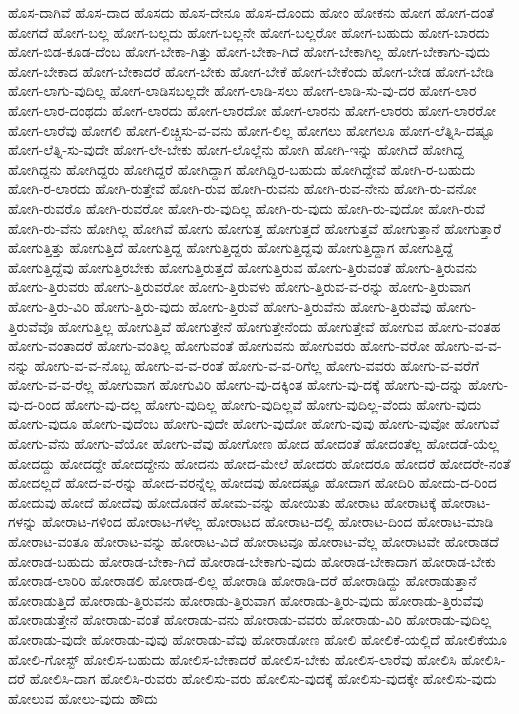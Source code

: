 {ಹೊಸ-ದಾಗಿವೆ
ಹೊಸ-ದಾದ
ಹೊಸದು
ಹೊಸ-ದೇನೂ
ಹೊಸ-ದೊಂದು
ಹೋಂ
ಹೋಕನು
ಹೋಗ
ಹೋಗ-ದಂತೆ
ಹೋಗದೆ
ಹೋಗ-ಬಲ್ಲ
ಹೋಗ-ಬಲ್ಲದು
ಹೋಗ-ಬಲ್ಲನೇ
ಹೋಗ-ಬಲ್ಲರೋ
ಹೋಗ-ಬಹುದು
ಹೋಗ-ಬಾರದು
ಹೋಗ-ಬಿಡ-ಕೂಡ-ದೆಂಬ
ಹೋಗ-ಬೇಕಾ-ಗಿತ್ತು
ಹೋಗ-ಬೇಕಾ-ಗಿದೆ
ಹೋಗ-ಬೇಕಾಗಿಲ್ಲ
ಹೋಗ-ಬೇಕಾಗು-ವುದು
ಹೋಗ-ಬೇಕಾದ
ಹೋಗ-ಬೇಕಾದರೆ
ಹೋಗ-ಬೇಕು
ಹೋಗ-ಬೇಕೆ
ಹೋಗ-ಬೇಕೆಂದು
ಹೋಗ-ಬೇಡ
ಹೋಗ-ಬೇಡಿ
ಹೋಗ-ಲಾಗು-ವುದಿಲ್ಲ
ಹೋಗ-ಲಾಡಿಸಬಲ್ಲದೇ
ಹೋಗ-ಲಾಡಿ-ಸಲು
ಹೋಗ-ಲಾಡಿ-ಸು-ವು-ದರ
ಹೋಗ-ಲಾರ
ಹೋಗ-ಲಾರ-ದಂಥದು
ಹೋಗ-ಲಾರದು
ಹೋಗ-ಲಾರದೋ
ಹೋಗ-ಲಾರನು
ಹೋಗ-ಲಾರರು
ಹೋಗ-ಲಾರರೋ
ಹೋಗ-ಲಾರೆವು
ಹೋಗಲಿ
ಹೋಗ-ಲಿಚ್ಚಿಸು-ವ-ವನು
ಹೋಗ-ಲಿಲ್ಲ
ಹೋಗಲು
ಹೋಗಲೂ
ಹೋಗ-ಲೆತ್ನಿಸಿ-ದಷ್ಟೂ
ಹೋಗ-ಲೆತ್ನಿ-ಸು-ವುದೇ
ಹೋಗ-ಲೇ-ಬೇಕು
ಹೋಗ-ಲೊಲ್ಲೆನು
ಹೋಗಿ
ಹೋಗಿ-ಇನ್ನು
ಹೋಗಿದೆ
ಹೋಗಿದ್ದ
ಹೋಗಿದ್ದನು
ಹೋಗಿದ್ದರು
ಹೋಗಿದ್ದರೆ
ಹೋಗಿದ್ದಾಗ
ಹೋಗಿದ್ದಿರ-ಬಹುದು
ಹೋಗಿದ್ದೇವೆ
ಹೋಗಿ-ರ-ಬಹುದು
ಹೋಗಿ-ರ-ಲಾರದು
ಹೋಗಿ-ರುತ್ತೇವೆ
ಹೋಗಿ-ರುವ
ಹೋಗಿ-ರುವನು
ಹೋಗಿ-ರುವ-ನೇನು
ಹೋಗಿ-ರು-ವನೋ
ಹೋಗಿ-ರುವರೊ
ಹೋಗಿ-ರುವರೋ
ಹೋಗಿ-ರು-ವುದಿಲ್ಲ
ಹೋಗಿ-ರು-ವುದು
ಹೋಗಿ-ರು-ವುದೋ
ಹೋಗಿ-ರುವೆ
ಹೋಗಿ-ರು-ವೆನು
ಹೋಗಿಲ್ಲ
ಹೋಗಿವೆ
ಹೋಗು
ಹೋಗುತ್ತ
ಹೋಗುತ್ತದೆ
ಹೋಗುತ್ತವೆ
ಹೋಗುತ್ತಾನೆ
ಹೋಗುತ್ತಾರೆ
ಹೋಗುತ್ತಿತ್ತು
ಹೋಗುತ್ತಿದೆ
ಹೋಗುತ್ತಿದ್ದ
ಹೋಗುತ್ತಿದ್ದರು
ಹೋಗುತ್ತಿದ್ದವು
ಹೋಗುತ್ತಿದ್ದಾಗ
ಹೋಗುತ್ತಿದ್ದೆ
ಹೋಗುತ್ತಿದ್ದೆವು
ಹೋಗುತ್ತಿರಬೇಕು
ಹೋಗುತ್ತಿರುತ್ತದೆ
ಹೋಗುತ್ತಿರುವ
ಹೋಗು-ತ್ತಿರುವಂತೆ
ಹೋಗು-ತ್ತಿರುವನು
ಹೋಗು-ತ್ತಿರುವರು
ಹೋಗು-ತ್ತಿರುವರೋ
ಹೋಗು-ತ್ತಿರುವಳು
ಹೋಗು-ತ್ತಿರುವ-ವ-ರನ್ನು
ಹೋಗು-ತ್ತಿರುವಾಗ
ಹೋಗು-ತ್ತಿರು-ವಿರಿ
ಹೋಗು-ತ್ತಿರು-ವುದು
ಹೋಗು-ತ್ತಿರುವೆ
ಹೋಗು-ತ್ತಿರುವೆನು
ಹೋಗು-ತ್ತಿರುವೆವು
ಹೋಗು-ತ್ತಿರುವೆವೊ
ಹೋಗುತ್ತಿಲ್ಲ
ಹೋಗುತ್ತಿವೆ
ಹೋಗುತ್ತೇನೆ
ಹೋಗುತ್ತೇನೆಂದು
ಹೋಗುತ್ತೇವೆ
ಹೋಗುವ
ಹೋಗು-ವಂತಹ
ಹೋಗು-ವಂತಾದರೆ
ಹೋಗು-ವಂತಿಲ್ಲ
ಹೋಗುವಂತೆ
ಹೋಗುವನು
ಹೋಗುವರು
ಹೋಗು-ವರೋ
ಹೋಗು-ವ-ವ-ನನ್ನು
ಹೋಗು-ವ-ವ-ನೊಬ್ಬ
ಹೋಗು-ವ-ವ-ರಂತೆ
ಹೋಗು-ವ-ವ-ರಿಗೆಲ್ಲ
ಹೋಗು-ವವರು
ಹೋಗು-ವ-ವರೆಗೆ
ಹೋಗು-ವ-ವ-ರೆಲ್ಲ
ಹೋಗುವಾಗ
ಹೋಗುವಿರಿ
ಹೋಗು-ವು-ದಕ್ಕಿಂತ
ಹೋಗು-ವು-ದಕ್ಕೆ
ಹೋಗು-ವು-ದನ್ನು
ಹೋಗು-ವು-ದ-ರಿಂದ
ಹೋಗು-ವು-ದಲ್ಲ
ಹೋಗು-ವುದಿಲ್ಲ
ಹೋಗು-ವುದಿಲ್ಲವೆ
ಹೋಗು-ವುದಿಲ್ಲ-ವೆಂದು
ಹೋಗು-ವುದು
ಹೋಗು-ವುದೂ
ಹೋಗು-ವುದೆಂಬ
ಹೋಗು-ವುದೇ
ಹೋಗು-ವುದೋ
ಹೋಗು-ವುವು
ಹೋಗು-ವುವೋ
ಹೋಗುವೆ
ಹೋಗು-ವೆನು
ಹೋಗು-ವೆಯೋ
ಹೋಗು-ವೆವು
ಹೋಗೋಣ
ಹೋದ
ಹೋದಂತೆ
ಹೋದಂತೆಲ್ಲ
ಹೋದಡೆ-ಯೆಲ್ಲ
ಹೋದದ್ದು
ಹೋದದ್ದೇ
ಹೋದದ್ದೇನು
ಹೋದನು
ಹೋದ-ಮೇಲೆ
ಹೋದರು
ಹೋದರೂ
ಹೋದರೆ
ಹೋದರೇ-ನಂತೆ
ಹೋದಲ್ಲದೆ
ಹೋದ-ವ-ರನ್ನು
ಹೋದ-ವರನ್ನೆಲ್ಲ
ಹೋದವು
ಹೋದಷ್ಟೂ
ಹೋದಾಗ
ಹೋದಿರಿ
ಹೋದು-ದ-ರಿಂದ
ಹೋದುವು
ಹೋದೆ
ಹೋದೆವು
ಹೋದೊಡನೆ
ಹೋಮ-ವನ್ನು
ಹೋಯಿತು
ಹೋರಾಟ
ಹೋರಾಟಕ್ಕೆ
ಹೋರಾಟ-ಗಳನ್ನು
ಹೋರಾಟ-ಗಳಿಂದ
ಹೋರಾಟ-ಗಳೆಲ್ಲ
ಹೋರಾಟದ
ಹೋರಾಟ-ದಲ್ಲಿ
ಹೋರಾಟ-ದಿಂದ
ಹೋರಾಟ-ಮಾಡಿ
ಹೋರಾಟ-ವಂತೂ
ಹೋರಾಟ-ವನ್ನು
ಹೋರಾಟ-ವಿದೆ
ಹೋರಾಟವೂ
ಹೋರಾಟ-ವೆಲ್ಲ
ಹೋರಾಟವೇ
ಹೋರಾಡದೆ
ಹೋರಾಡ-ಬಹುದು
ಹೋರಾಡ-ಬೇಕಾ-ಗಿದೆ
ಹೋರಾಡ-ಬೇಕಾಗು-ವುದು
ಹೋರಾಡ-ಬೇಕಾದಾಗ
ಹೋರಾಡ-ಬೇಕು
ಹೋರಾಡ-ಲಾರಿರಿ
ಹೋರಾಡಲಿ
ಹೋರಾಡ-ಲಿಲ್ಲ
ಹೋರಾಡಿ
ಹೋರಾಡಿ-ದರೆ
ಹೋರಾಡಿದ್ದು
ಹೋರಾಡುತ್ತಾನೆ
ಹೋರಾಡುತ್ತಿದೆ
ಹೋರಾಡು-ತ್ತಿರುವನು
ಹೋರಾಡು-ತ್ತಿರುವಾಗ
ಹೋರಾಡು-ತ್ತಿರು-ವುದು
ಹೋರಾಡು-ತ್ತಿರುವೆವು
ಹೋರಾಡುತ್ತೇನೆ
ಹೋರಾಡು-ವಂತೆ
ಹೋರಾಡು-ವನು
ಹೋರಾಡು-ವವರು
ಹೋರಾಡು-ವಿರಿ
ಹೋರಾಡು-ವುದಿಲ್ಲ
ಹೋರಾಡು-ವುದೇ
ಹೋರಾಡು-ವುವು
ಹೋರಾಡು-ವೆವು
ಹೋರಾಡೋಣ
ಹೋಲಿ
ಹೋಲಿಕೆ-ಯಲ್ಲಿದೆ
ಹೋಲಿಕೆಯೂ
ಹೋಲಿ-ಗೋಸ್ಟ್
ಹೋಲಿಸ-ಬಹುದು
ಹೋಲಿಸ-ಬೇಕಾದರೆ
ಹೋಲಿಸ-ಬೇಕು
ಹೋಲಿಸ-ಲಾರೆವು
ಹೋಲಿಸಿ
ಹೋಲಿಸಿ-ದರೆ
ಹೋಲಿಸಿ-ದಾಗ
ಹೋಲಿಸಿ-ರುವರು
ಹೋಲಿಸು-ವರು
ಹೋಲಿಸು-ವುದಕ್ಕೆ
ಹೋಲಿಸು-ವುದಕ್ಕೇ
ಹೋಲಿಸು-ವುದು
ಹೋಲುವ
ಹೋಲು-ವುದು
ಹೌದು
}
